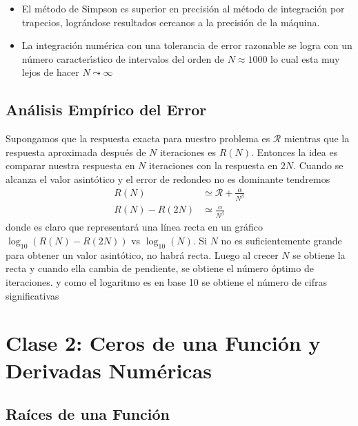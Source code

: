 \documentclass[spanish,titlepage,11pt]{article}
\begin{document}
\begin{itemize}
\item  El m\'{e}todo de Simpson es superior en precisi\'{o}n al m\'{e}todo de
integraci\'{o}n por trapecios, logr\'{a}ndose resultados cercanos a la
precisi\'{o}n de la m\'{a}quina.

\item  La integraci\'{o}n num\'{e}rica con una tolerancia de error razonable
se logra con un n\'{u}mero caracter\'{\i}stico de intervalos del orden de
$N\approx1000$ lo cual esta muy lejos de hacer $N\leadsto\infty$
\end{itemize}

\subsection{An\'{a}lisis Emp\'{i}rico del Error}

Supongamos que la respuesta exacta para nuestro problema es $\mathcal{R}$
mientras que la respuesta aproximada despu\'{e}s de $N$ iteraciones es
$R\left(  N\right)  .$ Entonces la idea es comparar nuestra respuesta en $N$
iteraciones con la respuesta en $2N.$ Cuando se alcanza el valor
asint\'{o}tico y el error de redondeo no es dominante tendremos
\begin{align}
R(N)  &  \simeq\mathcal{R}+\frac{\alpha}{N^{\beta}}\\
R\left(  N\right)  -R\left(  2N\right)   &  \simeq\frac{\alpha}{N^{\beta}}%
\end{align}
donde es claro que representar\'{a} una l\'{i}nea recta en un gr\'{a}fico
$\log_{10}\left(  R\left(  N\right)  -R\left(  2N\right)  \right)  $ vs
$\log_{10}\left(  N\right)  .$ Si $N$ no es suficientemente grande para
obtener un valor asint\'{o}tico, no habr\'{a} recta. Luego al crecer $N$ se
obtiene la recta y cuando ella cambia de pendiente, se obtiene el n\'{u}mero
\'{o}ptimo de iteraciones. y como el logaritmo es en base 10 se obtiene el
n\'{u}mero de cifras significativas

\newpage

\section{\textbf{Clase 2: Ceros de una Funci\'{o}n y Derivadas Num\'{e}ricas}}

\subsection{Ra\'{i}ces de una Funci\'{o}n}
\end{document}
